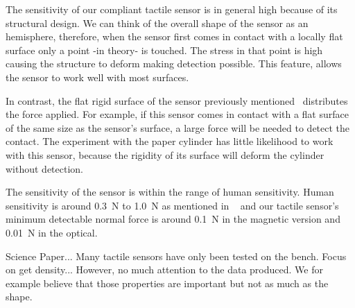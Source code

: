The sensitivity of our compliant tactile sensor is in general high
because of its structural design. We can think of the overall
shape of the sensor as an hemisphere, therefore, when the sensor
first comes in contact with a locally flat surface only a point
-in theory- is touched. The stress in that point is high causing
the structure to deform making detection possible. This feature,
allows the sensor to work well with most surfaces.

In contrast, the flat rigid surface of the sensor previously
mentioned~\cite{touchsensorScience} distributes the force applied.
For example, if this sensor comes in contact with a flat surface
of the same size as the sensor's surface, a large force will be
needed to detect the contact. The experiment with the paper
cylinder has little likelihood to work with this sensor, because
the rigidity of its surface will deform the cylinder without
detection.

The sensitivity of the sensor is within the range of human
sensitivity. Human sensitivity is around 0.3~N to 1.0~N as
mentioned in ~\cite{touchsensorScience} and our tactile sensor's
minimum detectable normal force is around 0.1~N in the magnetic
version and 0.01~N in the optical.


Science Paper... Many tactile sensors have only been tested on the
bench. Focus on get density... However, no much attention to the
data produced. We for example believe that those properties are
important but not as much as the shape.
%


